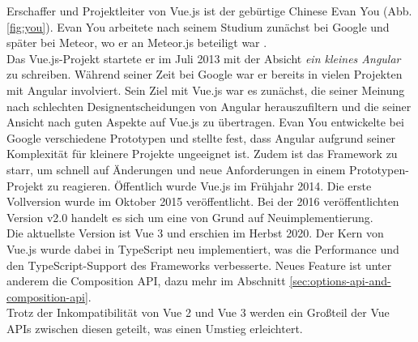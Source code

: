 Erschaffer und Projektleiter von Vue.js ist der gebürtige Chinese Evan You (Abb. \ref{fig:you}).
Evan You arbeitete nach seinem Studium zunächst bei Google und später bei Meteor, wo er
an Meteor.js beteiligt war \cite{linkedinYou}.
\\
Das Vue.js-Projekt startete er im Juli 2013 mit der Absicht \emph{ein kleines Angular}
zu schreiben.
Während seiner Zeit bei Google war er bereits in vielen Projekten mit Angular involviert.
Sein Ziel mit Vue.js war es zunächst, die seiner Meinung nach schlechten Designentscheidungen von Angular herauszufiltern
und die seiner Ansicht nach guten Aspekte auf Vue.js zu übertragen.
Evan You entwickelte bei Google verschiedene Prototypen und stellte fest,
dass Angular aufgrund seiner Komplexität für kleinere Projekte ungeeignet ist.
Zudem ist das Framework zu starr, um schnell auf Änderungen und neue Anforderungen in einem Prototypen-Projekt zu reagieren.
Öffentlich wurde Vue.js im Frühjahr 2014.
Die erste Vollversion wurde im Oktober 2015 veröffentlicht.
Bei der 2016 veröffentlichten Version v2.0 handelt es sich um eine von Grund auf Neuimplementierung. \cite[1:11-4:42]{vueNYC}
\\
Die aktuellste Version ist Vue 3 und erschien im Herbst 2020.
Der Kern von Vue.js wurde dabei in TypeScript neu implementiert, was die Performance und den TypeScript-Support des Frameworks verbesserte.
Neues Feature ist unter anderem die Composition API, dazu mehr im Abschnitt \ref{sec:options-api-and-composition-api}. \cite{konstantinidis2020}
\\
Trotz der Inkompatibilität von Vue 2 und Vue 3 werden ein Großteil der Vue APIs zwischen diesen geteilt,
was einen Umstieg erleichtert. \cite{vueFAQ}

